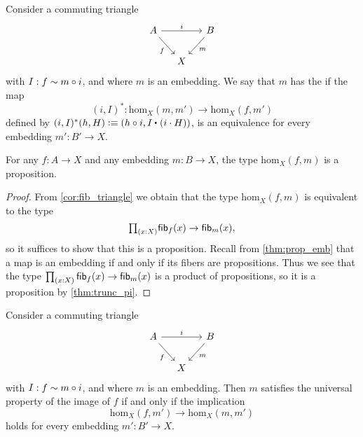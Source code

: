 \begin{defn}\label{defn:image_up}
Consider a commuting triangle
\begin{equation*}
\begin{tikzcd}[column sep=small]
A \arrow[rr,"i"] \arrow[dr,swap,"f"] & & B \arrow[dl,"m"] \\
& X
\end{tikzcd}
\end{equation*}
with $I:f\sim m\circ i$, and where $m$ is an embedding.
We say that $m$ has the  if the map
\begin{equation*}
(i,I)^\ast : \mathrm{hom}_X(m,m')\to\mathrm{hom}_X(f,m')
\end{equation*}
defined by $(i,I)^\ast(h,H)\defeq (h\circ i,\ct{I}{(i\cdot H)})$,
is an equivalence for every embedding $m':B'\to X$. 
\end{defn}

\begin{lem}
For any $f:A\to X$ and any embedding $m:B\to X$, the type $\mathrm{hom}_X(f,m)$ is a proposition.
\end{lem}

\begin{proof}
From \cref{cor:fib_triangle} we obtain that the type $\mathrm{hom}_X(f,m)$ is equivalent to the type
\begin{equation*}
\prd{x:X}\fib{f}{x}\to\fib{m}{x},
\end{equation*}
so it suffices to show that this is a proposition. 
Recall from \cref{thm:prop_emb} that a map is an embedding if and only if its fibers are propositions.
Thus we see that the type $\prd{x:X}\fib{f}{x}\to\fib{m}{x}$ is a product of propositions, so it is a proposition by \cref{thm:trunc_pi}.
\end{proof}

\begin{cor}\label{cor:image_up}
Consider a commuting triangle
\begin{equation*}
\begin{tikzcd}[column sep=small]
A \arrow[rr,"i"] \arrow[dr,swap,"f"] & & B \arrow[dl,"m"] \\
& X
\end{tikzcd}
\end{equation*}
with $I:f\sim m\circ i$, and where $m$ is an embedding. Then $m$ satisfies the universal property of the image of $f$ if and only if the implication
\begin{equation*}
\mathrm{hom}_X(f,m')\to\mathrm{hom}_X(m,m')
\end{equation*}
holds for every embedding $m':B'\to X$. 
\end{cor}

